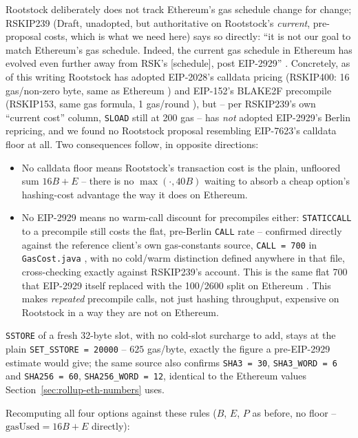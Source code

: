 Rootstock deliberately does not track Ethereum's gas schedule change for
change; RSKIP239 (Draft, unadopted, but authoritative on Rootstock's
\emph{current}, pre-proposal costs, which is what we need here) says so
directly: ``it is not our goal to match Ethereum's gas schedule. Indeed,
the current gas schedule in Ethereum has evolved even further away from
RSK's [schedule], post EIP-2929'' \citep{rskip239}. Concretely, as of this
writing Rootstock has adopted EIP-2028's calldata pricing (RSKIP400: 16
gas/non-zero byte, same as Ethereum \citep{rskip400}) and EIP-152's BLAKE2F
precompile (RSKIP153, same gas formula, 1 gas/round \citep{rskip153}), but
-- per RSKIP239's own ``current cost'' column, \texttt{SLOAD} still at 200
gas -- has \emph{not} adopted EIP-2929's Berlin repricing, and we found no
Rootstock proposal resembling EIP-7623's calldata floor at all. Two
consequences follow, in opposite directions:
\begin{itemize}
\item No calldata floor means Rootstock's transaction cost is the plain,
  unfloored sum $16B+E$ -- there is no $\max(\cdot,40B)$ waiting to
  absorb a cheap option's hashing-cost advantage the way it does on
  Ethereum.
\item No EIP-2929 means no warm-call discount for precompiles either:
  \texttt{STATICCALL} to a precompile still costs the flat, pre-Berlin
  \texttt{CALL} rate -- confirmed directly against the reference client's
  own gas-constants source, \texttt{CALL = 700} in \texttt{GasCost.java}
  \citep{rskjgascost}, with no cold/warm distinction defined anywhere in
  that file, cross-checking exactly against RSKIP239's account. This is
  the same flat 700 that EIP-2929 itself replaced with the 100/2600 split
  on Ethereum \citep{eip2929}. This makes \emph{repeated} precompile
  calls, not just hashing throughput, expensive on Rootstock in a way
  they are not on Ethereum.
\end{itemize}
\texttt{SSTORE} of a fresh 32-byte slot, with no cold-slot surcharge to
add, stays at the plain \texttt{SET\_SSTORE = 20000}
\citep{eip2200,rskjgascost} -- $625$ gas/byte, exactly the figure a
pre-EIP-2929 estimate would give; the same source also confirms
\texttt{SHA3 = 30}, \texttt{SHA3\_WORD = 6} and \texttt{SHA256 = 60},
\texttt{SHA256\_WORD = 12}, identical to the Ethereum values
Section~\ref{sec:rollup-eth-numbers} uses.

Recomputing all four options against these rules ($B$, $E$, $P$ as
before, no floor -- $\mathrm{gasUsed}=16B+E$ directly):

